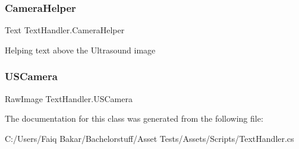 \subsubsection{\texorpdfstring{Camera\+Helper}{CameraHelper}}
{\footnotesize\ttfamily Text Text\+Handler.\+Camera\+Helper}



Helping text above the Ultrasound image 

\mbox{\label{class_text_handler_a7a3795c8944b19e170d1356e7905e276}} 
\subsubsection{\texorpdfstring{U\+S\+Camera}{USCamera}}
{\footnotesize\ttfamily Raw\+Image Text\+Handler.\+U\+S\+Camera}







The documentation for this class was generated from the following file\+:\begin{DoxyCompactItemize}
\item 
C\+:/\+Users/\+Faiq Bakar/\+Bachelorstuff/\+Asset Tests/\+Assets/\+Scripts/Text\+Handler.\+cs\end{DoxyCompactItemize}
